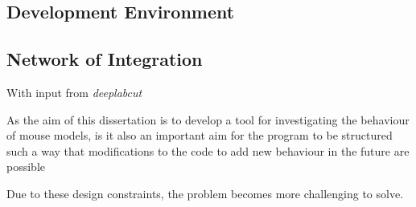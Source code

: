 \subsection{Development Environment}



\subsection{Network of Integration}


With input from \textit{deeplabcut}



As the aim of this dissertation is to develop a tool for investigating the behaviour of mouse models, is it also an important aim for the program to be structured such a way that modifications to the code to add new behaviour in the future are possible

Due to these design constraints, the problem becomes more challenging to solve. 


